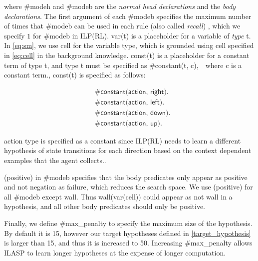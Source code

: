 where \textsf{\#modeh} and \textsf{\#modeb} are the \textit{normal head declarations} and the \textit{body declarations}. 
The first argument of each \textsf{\#modeb} specifies the maximum number of times that \textsf{\#modeb} can be used in each rule (also called \textit{recall}) \cite{Law2017}, 
which we specify $1$ for \textsf{\#modeb} in ILP(RL). \textsf{var(t)} is a placeholder for a variable of \textit{type} \textsf{t}. In \ref{eq:sm}, we use \textsf{cell} for the variable type, which is grounded using \textsf{cell} specified in \ref{eq:cell} in the background knowledge.
\textsf{const(t)} is a placeholder for a constant term of type \textsf{t}, and type \textsf{t} must be specified as \textsf{\#constant(t, c)},　where \textsf{c} is a constant term., 
\textsf{const(t)} is specified as follows:

\begin{equation}
\begin{split}
&\textsf{\#constant(action, right).}\\
&\textsf{\#constant(action, left).}\\
&\textsf{\#constant(action, down).}\\
&\textsf{\#constant(action, up).}
\end{split}
\end{equation}

\textsf{action} type is specified as a constant since ILP(RL) needs to learn a different hypothesis of state transitions for each direction based on the context dependent examples that the agent collects..

\textsf{(positive)} in \textsf{\#modeb} specifies that the body predicates only appear as positive and not negation as failure, which reduces the search space. We use \textsf{(positive)} for all \textsf{\#modeb} except \textsf{wall}. Thus \textsf{wall(var(cell))} could appear as \textsf{not wall} in a hypothesis, and all other body predicates should only be positive.

Finally, we define \textsf{\#max\_penalty} to specify the maximum size of the hypothesis. By default it is 15, however our target hypotheses defined in \ref{target_hypothesis} is larger than 15, and thus it is increased to 50.
Increasing \#max\_penalty allows ILASP to learn longer hypotheses at the expense of longer computation.

